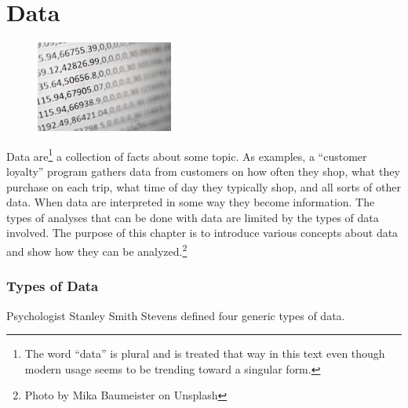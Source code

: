 \chapter{Data}\label{06:data}

\begin{figure}
	\label{06:fig01} 
	\centering
	\includegraphics[width=0.4\textwidth]{gfx/06-data} 
\end{figure}
Data are\footnote{The word ``data'' is plural and is treated that way in this text even though modern usage seems to be trending toward a singular form.} a collection of facts about some topic. As examples, a ``customer loyalty'' program gathers data from customers on how often they shop, what they purchase on each trip, what time of day they typically shop, and all sorts of other data. When data are interpreted in some way they become information. The types of analyses that can be done with data are limited by the types of data involved. The purpose of this chapter is to introduce various concepts about data and show how they can be analyzed.\footnote{Photo by Mika Baumeister on Unsplash}


\subsection{Types of Data}

Psychologist Stanley Smith Stevens defined four generic types of data\cite{stevens1946theory}. 

